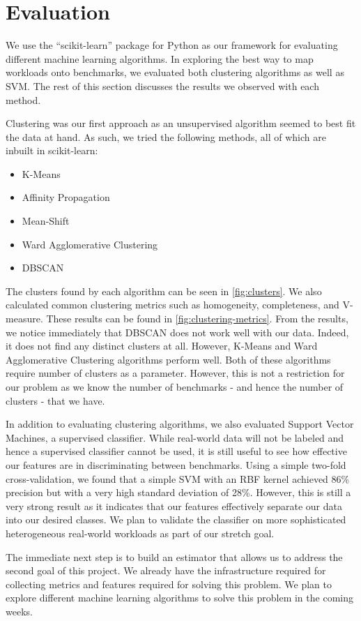 \section{Evaluation} \label{sec:eval}

We use the ``scikit-learn'' \citep{scikit-learn} package for Python
as our framework for evaluating different machine learning algorithms. 
In exploring the best way to map workloads onto benchmarks, we evaluated both
clustering algorithms as well as SVM. The rest of this section discusses the results we
observed with each method.

Clustering was our first approach as an unsupervised algorithm seemed
to best fit the data at hand. As such, we tried the following methods,
all of which are inbuilt in scikit-learn:\\

\begin{itemize}
\item K-Means
\item Affinity Propagation
\item Mean-Shift
\item Ward Agglomerative Clustering
\item DBSCAN
\end{itemize}

The clusters found by each algorithm can be seen in
\cref{fig:clusters}. We also calculated common clustering metrics such
as homogeneity, completeness, and V-measure. These results can be
found in \cref{fig:clustering-metrics}. From the results, we notice
immediately that DBSCAN does not work well with our data. Indeed, it
does not find any distinct clusters at all. However, K-Means and Ward
Agglomerative Clustering algorithms perform well. 
Both of these algorithms require number of clusters as a 
parameter. 
However, this is not a restriction for our problem as we
know the number of benchmarks - and hence the number of clusters -
that we have.

In addition to evaluating clustering algorithms, we also evaluated
Support Vector Machines, a supervised classifier. While real-world
data will not be labeled and hence a supervised classifier cannot be
used, it is still useful to see how effective our features are in
discriminating between benchmarks. Using a simple two-fold
cross-validation, we found that a simple SVM with an RBF kernel
achieved 86\% precision but with a very high standard deviation of
28\%. However, this is still a very strong result as it indicates that
our features effectively separate our data into our desired
classes. 
We plan to validate the classifier on more sophisticated heterogeneous 
real-world workloads as part of our stretch goal.

The immediate next step is to build an estimator that allows us to address the
second goal of this project. We already have the infrastructure required
for collecting metrics and features required for solving this problem.
We plan to explore different machine learning algorithms to solve this
problem in the coming weeks.
 


